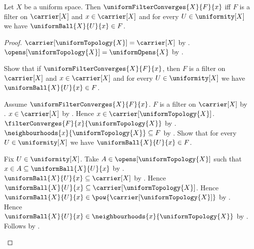 \begin{theorem}\label{uniform_filter_convergence_iff_entourages}
    Let $X$ be a uniform space.
    Then $\uniformFilterConverges{X}{F}{x}$ iff
        $F$ is a filter on $\carrier[X]$ and $x\in\carrier[X]$ and for every
            $U\in\uniformity[X]$ we have $\uniformBall{X}{U}{x}\in F$.
\end{theorem}
\begin{proof}
    $\carrier[\uniformTopology{X}]=\carrier[X]$
        by .
    $\opens[\uniformTopology{X}]=\uniformOpens{X}$
        by .

    Show that if $\uniformFilterConverges{X}{F}{x}$, then
        $F$ is a filter on $\carrier[X]$ and $x\in\carrier[X]$ and for every
            $U\in\uniformity[X]$ we have $\uniformBall{X}{U}{x}\in F$.
    \begin{subproof}
        Assume $\uniformFilterConverges{X}{F}{x}$.
        $F$ is a filter on $\carrier[X]$ by
            .
        $x\in\carrier[X]$ by .
        Hence $x\in\carrier[\uniformTopology{X}]$.
        $\filterConverges{F}{x}{\uniformTopology{X}}$
            by .
        $\neighbourhoods{x}{\uniformTopology{X}}\subseteq F$
            by .
        Show that for every $U\in\uniformity[X]$ we have
            $\uniformBall{X}{U}{x}\in F$.
        \begin{subproof}
            Fix $U\in\uniformity[X]$.
            Take $A\in\opens[\uniformTopology{X}]$ such that
                $x\in A\subseteq\uniformBall{X}{U}{x}$
                by .
            $\uniformBall{X}{U}{x}\subseteq\carrier[X]$
                by .
            Hence $\uniformBall{X}{U}{x}
                \subseteq\carrier[\uniformTopology{X}]$.
            Hence $\uniformBall{X}{U}{x}
                \in\pow{\carrier[\uniformTopology{X}]}$
                by .
            Hence $\uniformBall{X}{U}{x}
                \in\neighbourhoods{x}{\uniformTopology{X}}$
                by .
            Follows by .
        \end{subproof}
    \end{subproof}


\end{proof}

